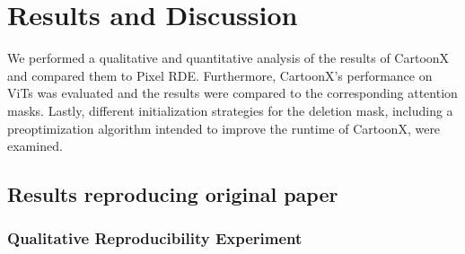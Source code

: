 \section{Results and Discussion}
\label{sec:results}


We performed a qualitative and quantitative analysis of the results of CartoonX and compared them to Pixel RDE.
Furthermore, CartoonX's performance on ViTs was evaluated and the results were compared to the corresponding attention masks.
Lastly, different initialization strategies for the deletion mask, including a preoptimization algorithm intended to improve the runtime of CartoonX, were examined.

\subsection{Results reproducing original paper} \label{sec:repro}

\subsubsection{Qualitative Reproducibility Experiment}


